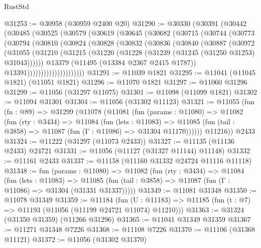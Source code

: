 \begin{lexlean}{RustStd}
\begin{coremodule}
@31253 := @30958 (@30959 @2400 @20)
@31290 := @30330
    (@30391
      (@30442
        (@30485
          (@30525
            (@30579
              (@30619
                (@30645
                  (@30682
                    (@30715
                      (@30744
                        (@30773
                          (@30794
                            (@30810
                              (@30824
                                (@30828
                                  (@30832
                                    (@30836
                                      (@30840
                                        (@30887
                                          (@30972
                                            (@31055
                                              (@31210
                                                (@31215
                                                  (@31220
                                                    (@31228
                                                      (@31239 (@31245 (@31250 @31253) @31043))))))
                                              @13379
                                              (@11495 (@13384 @2367 @2415 @1787))
                                              @13391)))))))))))))))))))))
@31291 := @11039 @1821
@31295 := @11041 (@11045 @1821) (@11051 @1821)
@31296 := @11070 @1821
@31297 := @11060 @31296
@31299 := @11056 (@31297 @11075)
@31301 := @11098 (@11099 @1821)
@31302 := @11094 @31301
@31304 := @11056 (@31302 @11123)
@31321 := @11055
    (fun (fn : @89) =>
    @31299
      (@11078
        (@11081
          (fun (params : @11080) =>
          @11082
            (fun (rty : @3434) =>
            @11084
              (fun (lets : @11083) =>
              @11085 (fun (tail : @3858) => @11087 (fun (Γ : @11086) => @31304 @11170))))))
        @11216))
    @2433
@31324 := @11222 (@31297 (@11073 @2433))
@31327 := @11135 (@11136 @2433) @24721
@31331 := @11056 (@11127 (@31327 @11144) @11148)
@31332 := @11161 @2433
@31337 := @11158 (@11160 @31332 @24724 @11116 @11118)
@31348 := fun (params : @11080) =>
  @11082
    (fun (rty : @3434) =>
    @11084
      (fun (lets : @11083) =>
      @11085 (fun (tail : @3858) => @11087 (fun (Γ : @11086) => @31304 (@31331 @31337)))))
@31349 := @11081 @31348
@31350 := @11078 @31349
@31359 := @11184
    (fun (U : @11183) => @11185 (fun (t : @7) => @11193 (@11056 (@11199 @24721 @11074) @11210)))
@31363 := @31324 (@31350 @31359) (@11266 @31296)
@31365 := @11041 @31349 @31359
@31367 := @11271 @31348 @7226
@31368 := @11108 @7226
@31370 := @11106 (@31368 @11121)
@31372 := @11056 (@31302 @31370)

\end{coremodule}
\end{lexlean}
